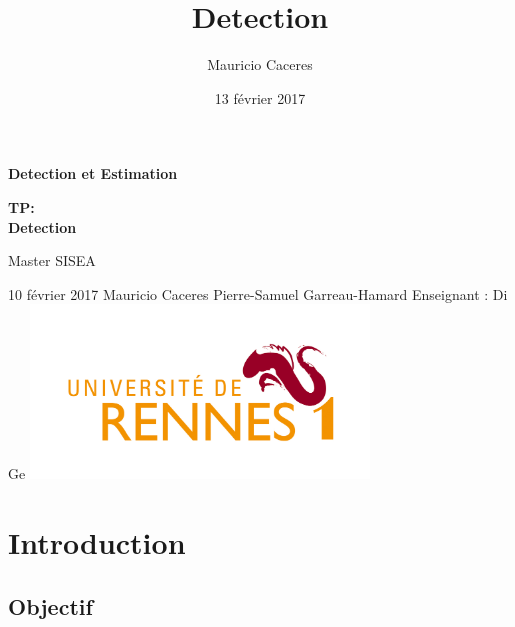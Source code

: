 \documentclass{report}
\title{Detection}
\author{Mauricio Caceres}
\date{13 février 2017}
\begin{document}
\begin{titlepage}
	\centering
	\vfill
{\bfseries\huge Detection et Estimation}
	\vfill
	{\bfseries\LARGE
		TP:\\
		Detection
		\\
		\vskip2cm

		Master SISEA\\
	
	}
	\vfill
	10 février 2017
	\vfill
	{\large Mauricio Caceres } \hfill  {\large Pierre-Samuel Garreau-Hamard}
	\vfill
	{\large Enseignant : Di Ge }
	\vfill
	\includegraphics[width=9cm]{rennes} %
	\vfill
	\vfill
\end{titlepage}





\chapter{Introduction}
\section{Objectif}
\end{document}
